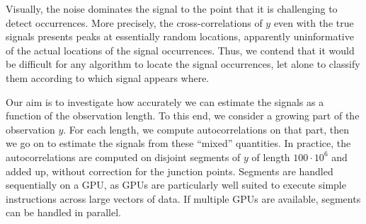 \documentclass[12pt]{article}
\newcommand{\1}{\mathbf{1}}
\theoremstyle{plain}
\theoremstyle{definition}
\theoremstyle{remark}
\theoremstyle{plain}
\theoremstyle{remark}
\theoremstyle{plain}
\theoremstyle{plain}
\theoremstyle{plain}
\numberwithin{equation}{section}
\begin{document}
Visually, the noise dominates the signal to the point that it is challenging to detect occurrences. More precisely, the cross-correlations of $y$ even with the true signals presents peaks at essentially random locations, apparently uninformative of the actual locations of the signal occurrences. Thus, we contend that it would be difficult for any algorithm to locate the signal occurrences, let alone to classify them according to which signal appears where.


Our aim is to investigate how accurately we can estimate the signals as a function of the observation length. To this end, we consider a growing part of the observation $y$. For each length, we compute autocorrelations on that part, then we go on to estimate the signals from these ``mixed'' quantities. In practice, the autocorrelations are computed on disjoint segments of $y$ of length $100\cdot10^6$ and added up, without correction for the junction points. Segments are handled sequentially on a GPU, as GPUs are particularly well suited to execute simple instructions across large vectors of data. If multiple GPUs are available, segments can  be handled in parallel.
\end{document}
